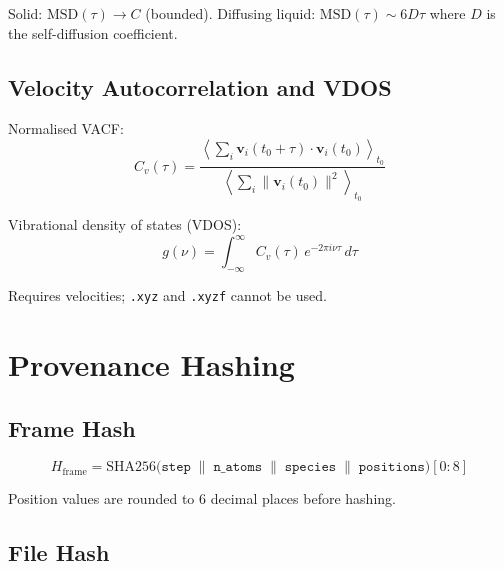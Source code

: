 \documentclass[11pt, a4paper, oneside]{article}
\begin{document}
Solid: $\mathrm{MSD}(\tau) \to C$ (bounded).
Diffusing liquid: $\mathrm{MSD}(\tau) \sim 6D\tau$ where $D$ is the
self-diffusion coefficient.

\subsection{Velocity Autocorrelation and VDOS}
\label{sec:vacf}

Normalised VACF:
\begin{equation}
  C_v(\tau) =
  \frac{
    \left\langle
      \sum_{i} \mathbf{v}_i(t_0+\tau) \cdot \mathbf{v}_i(t_0)
    \right\rangle_{t_0}
  }{
    \left\langle
      \sum_{i} \|\mathbf{v}_i(t_0)\|^2
    \right\rangle_{t_0}
  }
  \label{eq:vacf}
\end{equation}

Vibrational density of states (VDOS):
\begin{equation}
  g(\nu) = \int_{-\infty}^{\infty} C_v(\tau)\, e^{-2\pi i \nu \tau}\, d\tau
  \label{eq:vdos}
\end{equation}

Requires velocities; \texttt{.xyz} and \texttt{.xyzf} cannot be used.

\section{Provenance Hashing}
\label{sec:provenance}

\subsection{Frame Hash}
\label{sec:provenance_frame}

\begin{equation}
  H_{\mathrm{frame}} = \mathrm{SHA256}\bigl(
    \texttt{step} \;\|\; \texttt{n\_atoms}
    \;\|\; \texttt{species} \;\|\; \texttt{positions}
  \bigr)[0:8]
  \label{eq:frame_hash}
\end{equation}

Position values are rounded to 6 decimal places before hashing.

\subsection{File Hash}
\label{sec:provenance_file}
\end{document}
